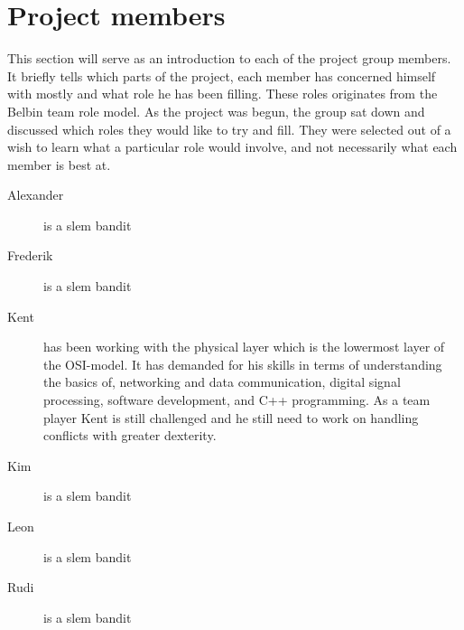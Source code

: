 \section{Project members}
This section will serve as an introduction to each of the project group members. It briefly tells which parts of the project, each member has concerned himself with mostly and what role he has been filling. These roles originates from the Belbin team role model. As the project was begun, the group sat down and discussed which roles they would like to try and fill. They were selected out of a wish to learn what a particular role would involve, and not necessarily what each member is best at.

\begin{description}
 \item[Alexander] is a slem bandit
 \item[Frederik] is a slem bandit
 \item[Kent]
 has been working with the physical layer which is the lowermost layer of the OSI-model. It has demanded for his skills in terms of understanding the basics of, networking and data communication, digital signal processing, software development, and C++ programming. As a team player Kent is still challenged and he still need to work on handling conflicts with greater dexterity.
 \item[Kim] is a slem bandit
 \item[Leon] is a slem bandit
 \item[Rudi] is a slem bandit
\end{description}